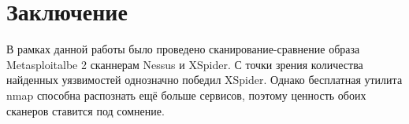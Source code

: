 \section*{Заключение}
%

В рамках данной работы было проведено сканирование-сравнение образа Metasploitalbe 2 сканнерам Nessus и XSpider. С точки зрения количества найденных уязвимостей однозначно победил XSpider. Однако бесплатная утилита nmap способна распознать ещё больше сервисов, поэтому ценность обоих сканеров ставится под сомнение.